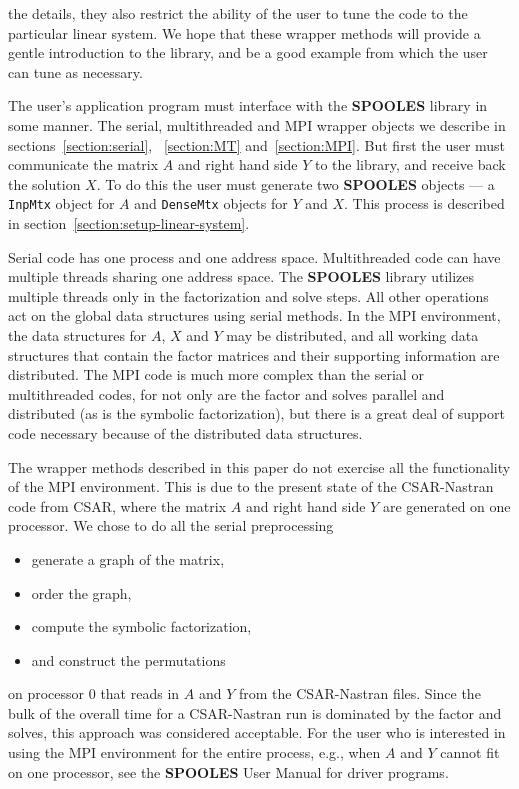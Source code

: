 the details, they also restrict the ability of the user to tune the
code to the particular linear system.
We hope that these wrapper methods will provide a gentle
introduction to the library, and be a good example from which the
user can tune as necessary.
\par
The user's application program must interface with the {\bf SPOOLES}
library in some manner.
The serial, multithreaded and MPI wrapper objects we describe in
sections~\ref{section:serial}, ~\ref{section:MT} and~\ref{section:MPI}.
But first the user must communicate the matrix $A$ and right hand
side $Y$ to the library, and receive back the solution $X$.
To do this the user must generate two {\bf SPOOLES} objects 
--- a {\tt InpMtx} object for $A$ and {\tt DenseMtx} objects for
$Y$ and $X$.
This process is described in section~\ref{section:setup-linear-system}.
\par
Serial code has one process and one address space.
Multithreaded code can have multiple threads sharing one address
space.
The {\bf SPOOLES} library utilizes multiple threads only in the
factorization and solve steps.
All other operations act on the global data structures using serial
methods.
In the MPI environment, the data structures for $A$, $X$ and $Y$
may be distributed, and all working data structures that contain
the factor matrices and their supporting information are distributed.
The MPI code is much more complex than the serial or multithreaded
codes, for not only are the factor and solves parallel and
distributed (as is the symbolic factorization), but there is a
great deal of support code necessary because of the distributed
data structures.
\par
The wrapper methods described in this paper do not exercise all the
functionality of the MPI environment.
This is due to the present state of the CSAR-Nastran code from CSAR,
where the matrix $A$ and right hand side $Y$ are generated on one
processor. We chose to do all the serial preprocessing 
\begin{itemize}
\item generate a graph of the matrix,
\item order the graph,
\item compute the symbolic factorization,
\item and construct the permutations
\end{itemize}
on processor 0 that reads in $A$ and $Y$ from the CSAR-Nastran files.
Since the bulk of the overall time for a CSAR-Nastran run is dominated
by the factor and solves, this approach was considered acceptable.
For the user who is interested in using the MPI environment for the
entire process, e.g., when $A$ and $Y$ cannot fit on one processor,
see the {\bf SPOOLES} User Manual for driver programs.

